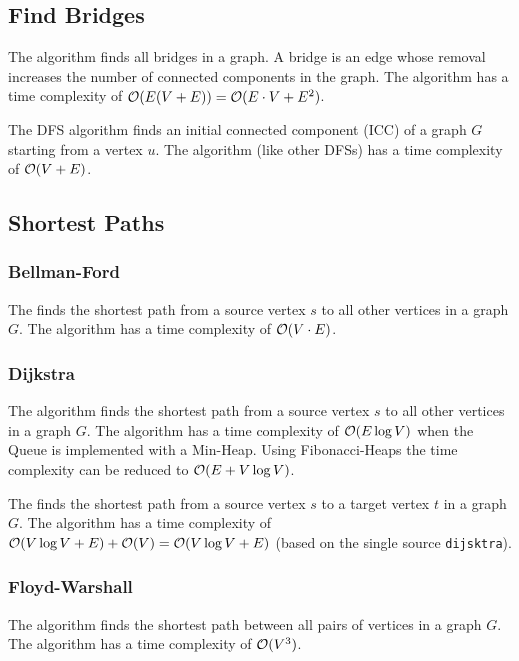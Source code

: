\documentclass{article}
\begin{document}
\subsection{Find Bridges}
The  algorithm finds all bridges in a graph. A bridge is an edge whose removal increases the number of connected components in the graph. The algorithm has a time complexity of $\mathcal{O}(E(V+E))=\mathcal{O}(E\cdot V+E^2)$.\par

The DFS algorithm  finds an initial connected component (ICC) of a graph $G$ starting from a vertex $u$. The algorithm (like other DFSs) has a time complexity of $\mathcal{O}(V+E)$.\par


\subsection{Shortest Paths}


\subsubsection{Bellman-Ford}
The  finds the shortest path from a source vertex $s$ to all other vertices in a graph $G$. The algorithm has a time complexity of $\mathcal{O}(V\cdot E)$.\par


\subsubsection{Dijkstra}
The  algorithm finds the shortest path from a source vertex $s$ to all other vertices in a graph $G$. The algorithm has a time complexity of $\mathcal{O}(E\log V)$ when the Queue is implemented with a Min-Heap. Using Fibonacci-Heaps the time complexity can be reduced to $\mathcal{O}(E+V\log V)$.\par


The  finds the shortest path from a source vertex $s$ to a target vertex $t$ in a graph $G$. The algorithm has a time complexity of $\mathcal{O}(V\log V+E)+\mathcal{O}(V)=\mathcal{O}(V\log V+E)$ (based on the single source \texttt{dijsktra}).\par


\subsubsection{Floyd-Warshall}
The  algorithm finds the shortest path between all pairs of vertices in a graph $G$. The algorithm has a time complexity of $\mathcal{O}(V^3)$.\par

\end{document}
